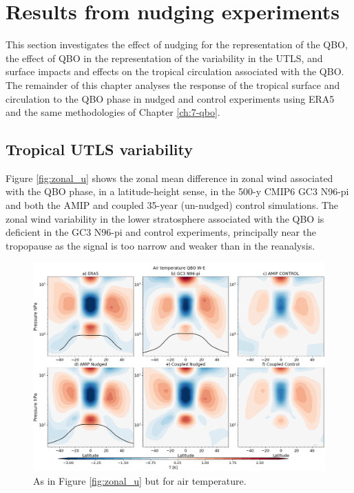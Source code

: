 \section{ Results from nudging experiments} \label{sq:ndg_results}

This section investigates the effect of nudging for the representation of the QBO, the effect of QBO in the representation of the variability in the UTLS, and  surface impacts and effects on the tropical circulation associated with the QBO.
The remainder of this chapter analyses the response of the tropical surface and circulation to the QBO phase in nudged and control experiments using ERA5 and the same methodologies of Chapter \ref{ch:7-qbo}.


\subsection{Tropical UTLS variability}

Figure \ref{fig:zonal_u} shows the zonal mean difference in zonal wind associated with the QBO phase, in a latitude-height sense, in the 500-y CMIP6 GC3 N96-pi and both the AMIP and coupled 35-year (un-nudged) control simulations. The zonal wind variability in the lower stratosphere associated with the QBO is deficient in the GC3 N96-pi and control experiments, principally near the tropopause as the signal is too narrow and weaker than in the reanalysis.
 
\begin{figure}[t!]
\centering
 \includegraphics[width=\linewidth]{figures/zonalplotair_temperature.png}
\caption[Zonal mean air temperature QBO difference]{As in Figure \ref{fig:zonal_u} but for air temperature.  }
\label{fig:zonal_T}
\end{figure} 

